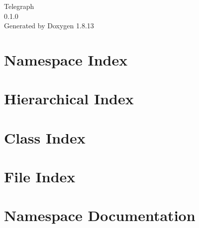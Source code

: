 \documentclass[twoside]{book}
\newcommand{\+}{\discretionary{\mbox{\scriptsize$\hookleftarrow$}}{}{}}
\newcommand{\clearemptydoublepage}{%
  \newpage{\pagestyle{empty}\cleardoublepage}%
}
\begin{document}
\hypersetup{pageanchor=false,
             bookmarksnumbered=true,
             pdfencoding=unicode
            }
\begin{titlepage}
\vspace*{7cm}
\begin{center}%
{\Large Telegraph \\[1ex]\large 0.\+1.\+0 }\\
\vspace*{1cm}
{\large Generated by Doxygen 1.8.13}\\
\end{center}
\end{titlepage}
\clearemptydoublepage
{}
\tableofcontents
\clearemptydoublepage
{}
\hypersetup{pageanchor=true}

\chapter{Namespace Index}

\chapter{Hierarchical Index}

\chapter{Class Index}

\chapter{File Index}

\chapter{Namespace Documentation}












\end{document}
